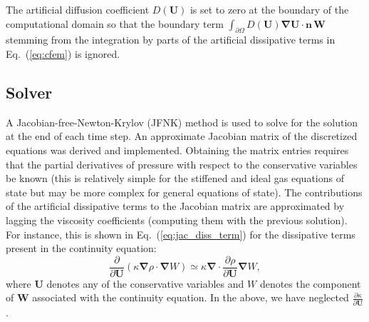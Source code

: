 \documentclass[preprint,10pt]{elsarticle}
\renewcommand{\div}{\mbold{\nabla}\! \cdot \!}
\newcommand{\grad}{\mbold{\nabla}}
\newcommand{\mbold}[1]{\boldsymbol#1}
\newcommand{\eqt}[1]{Eq.~(\ref{#1})}                     %
\newcommand{\sct}[1]{Section~\ref{#1}}                   %
\newcommand{\tcr}[1]{\textcolor{red}{#1}}
\begin{document}
The artificial diffusion coefficient $D(\mathbf  U)$ is set to zero at the boundary of the computational 
domain so that the boundary term 
$\int_{\partial \Omega} D(\mathbf  U) \grad \mathbf  U \cdot \mbold{n} \, \mathbf W$ stemming from the 
integration by parts of the artificial dissipative terms in \eqt{eq:cfem} is ignored.
\subsection{Solver} \label{sec:solver}
A Jacobian-free-Newton-Krylov (JFNK) method is used to solve for the solution at the end of each time step. 
An approximate Jacobian matrix of the discretized equations was derived and implemented. Obtaining the 
matrix entries requires that the partial derivatives of pressure with respect to the conservative variables 
be known (this is relatively simple for the stiffened and ideal gas equations of state but may be more 
complex for general equations of state). The contributions of the artificial dissipative terms to the 
Jacobian matrix are approximated by lagging the viscosity coefficients (computing them with the previous solution). 
For instance, this is shown in \eqt{eq:jac_diss_term} for the dissipative terms present in the continuity equation:
\begin{equation}
\label{eq:jac_diss_term}
\frac{\partial}{\partial \mathbf U} \left( \kappa \grad \rho \cdot \grad W \right) \simeq \kappa \div \frac{\partial \rho}{\partial \mathbf U} \grad W ,
\end{equation}  
where $\mathbf  U$ denotes any of the conservative variables and $W$ denotes the component of $\mathbf  W$ associated with the 
continuity equation. In the above, we have neglected $\frac{\partial \kappa}{\partial \mathbf U}$.
\end{document}
